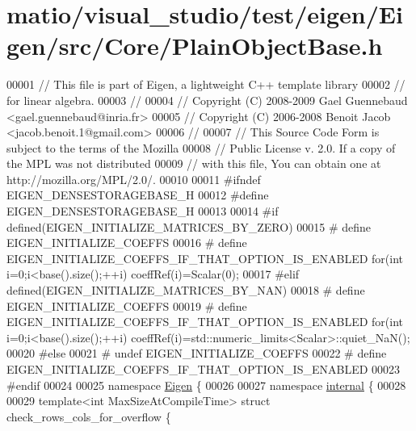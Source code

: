 \hypertarget{matio_2visual__studio_2test_2eigen_2_eigen_2src_2_core_2_plain_object_base_8h_source}{}\section{matio/visual\+\_\+studio/test/eigen/\+Eigen/src/\+Core/\+Plain\+Object\+Base.h}
\label{matio_2visual__studio_2test_2eigen_2_eigen_2src_2_core_2_plain_object_base_8h_source}

\begin{DoxyCode}
00001 \textcolor{comment}{// This file is part of Eigen, a lightweight C++ template library}
00002 \textcolor{comment}{// for linear algebra.}
00003 \textcolor{comment}{//}
00004 \textcolor{comment}{// Copyright (C) 2008-2009 Gael Guennebaud <gael.guennebaud@inria.fr>}
00005 \textcolor{comment}{// Copyright (C) 2006-2008 Benoit Jacob <jacob.benoit.1@gmail.com>}
00006 \textcolor{comment}{//}
00007 \textcolor{comment}{// This Source Code Form is subject to the terms of the Mozilla}
00008 \textcolor{comment}{// Public License v. 2.0. If a copy of the MPL was not distributed}
00009 \textcolor{comment}{// with this file, You can obtain one at http://mozilla.org/MPL/2.0/.}
00010 
00011 \textcolor{preprocessor}{#ifndef EIGEN\_DENSESTORAGEBASE\_H}
00012 \textcolor{preprocessor}{#define EIGEN\_DENSESTORAGEBASE\_H}
00013 
00014 \textcolor{preprocessor}{#if defined(EIGEN\_INITIALIZE\_MATRICES\_BY\_ZERO)}
00015 \textcolor{preprocessor}{# define EIGEN\_INITIALIZE\_COEFFS}
00016 \textcolor{preprocessor}{# define EIGEN\_INITIALIZE\_COEFFS\_IF\_THAT\_OPTION\_IS\_ENABLED for(int i=0;i<base().size();++i)
       coeffRef(i)=Scalar(0);}
00017 \textcolor{preprocessor}{#elif defined(EIGEN\_INITIALIZE\_MATRICES\_BY\_NAN)}
00018 \textcolor{preprocessor}{# define EIGEN\_INITIALIZE\_COEFFS}
00019 \textcolor{preprocessor}{# define EIGEN\_INITIALIZE\_COEFFS\_IF\_THAT\_OPTION\_IS\_ENABLED for(int i=0;i<base().size();++i)
       coeffRef(i)=std::numeric\_limits<Scalar>::quiet\_NaN();}
00020 \textcolor{preprocessor}{#else}
00021 \textcolor{preprocessor}{# undef EIGEN\_INITIALIZE\_COEFFS}
00022 \textcolor{preprocessor}{# define EIGEN\_INITIALIZE\_COEFFS\_IF\_THAT\_OPTION\_IS\_ENABLED}
00023 \textcolor{preprocessor}{#endif}
00024 
00025 \textcolor{keyword}{namespace }\hyperlink{namespace_eigen}{Eigen} \{
00026 
00027 \textcolor{keyword}{namespace }\hyperlink{namespaceinternal}{internal} \{
00028 
00029 \textcolor{keyword}{template}<\textcolor{keywordtype}{int} MaxSizeAtCompileTime> \textcolor{keyword}{struct }check\_rows\_cols\_for\_overflow \{

\end{DoxyCode}
